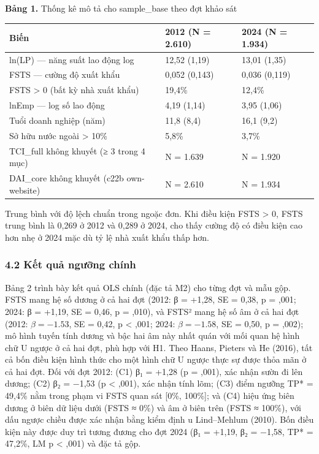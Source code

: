 \documentclass[12pt,a4paper]{article}
\begin{document}
\textbf{Bảng 1.} Thống kê mô tả cho sample\_base theo đợt khảo sát

\begin{longtable}[]{@{}lll@{}}
\toprule\noalign{}
Biến & 2012 (N = 2.610) & 2024 (N = 1.934) \\
\midrule\noalign{}
\endhead
\bottomrule\noalign{}
\endlastfoot
ln(LP) --- năng suất lao động log & 12,52 (1,19) & 13,01 (1,35) \\
FSTS --- cường độ xuất khẩu & 0,052 (0,143) & 0,036 (0,119) \\
FSTS \textgreater{} 0 (bất kỳ nhà xuất khẩu) & 19,4\% & 12,4\% \\
lnEmp --- log số lao động & 4,19 (1,14) & 3,95 (1,06) \\
Tuổi doanh nghiệp (năm) & 11,8 (8,4) & 16,1 (9,2) \\
Sở hữu nước ngoài \textgreater{} 10\% & 5,8\% & 3,7\% \\
TCI\_full không khuyết (≥ 3 trong 4 mục) & N = 1.639 & N = 1.920 \\
DAI\_core không khuyết (c22b own-website) & N = 2.610 & N = 1.934 \\
\end{longtable}

Trung bình với độ lệch chuẩn trong ngoặc đơn. Khi điều kiện FSTS
\textgreater{} 0, FSTS trung bình là 0,269 ở 2012 và 0,289 ở 2024, cho
thấy cường độ có điều kiện cao hơn nhẹ ở 2024 mặc dù tỷ lệ nhà xuất khẩu
thấp hơn.

\hypertarget{42-kux1ebft-quux1ea3-ngux1b0ux1ee1ng-chuxednh}{%
\subsubsection{4.2 Kết quả ngưỡng
chính}\label{42-kux1ebft-quux1ea3-ngux1b0ux1ee1ng-chuxednh}}

Bảng 2 trình bày kết quả OLS chính (đặc tả M2) cho từng đợt và mẫu gộp.
FSTS mang hệ số dương ở cả hai đợt (2012: β = +1,28, SE = 0,38, p =
,001; 2024: β = +1,19, SE = 0,46, p = ,010), và FSTS² mang hệ số âm ở cả
hai đợt (2012: \(\beta = −1.53\), SE = 0,42, p \textless{} ,001; 2024:
\(\beta = −1.58\), SE = 0,50, p = ,002); mô hình tuyến tính dương và bậc
hai âm này nhất quán với mối quan hệ hình chữ U ngược ở cả hai đợt, phù
hợp với H1. Theo Haans, Pieters và He (2016), tất cả bốn điều kiện hình
thức cho một hình chữ U ngược thực sự được thỏa mãn ở cả hai đợt. Đối
với đợt 2012: (C1) β₁ = +1,28 (p = ,001), xác nhận sườn đi lên dương;
(C2) β₂ = −1,53 (p \textless{} ,001), xác nhận tính lõm; (C3) điểm
ngưỡng TP* = 49,4\% nằm trong phạm vi FSTS quan sát {[}0\%, 100\%{]}; và
(C4) hiệu ứng biên dương ở biên dữ liệu dưới (FSTS ≈ 0\%) và âm ở biên
trên (FSTS ≈ 100\%), với dấu ngược chiều được xác nhận bằng kiểm định u
Lind--Mehlum (2010). Bốn điều kiện này được duy trì tương đương cho đợt
2024 (β₁ = +1,19, β₂ = −1,58, TP* = 47,2\%, LM p \textless{} ,001) và
đặc tả gộp.
\end{document}

